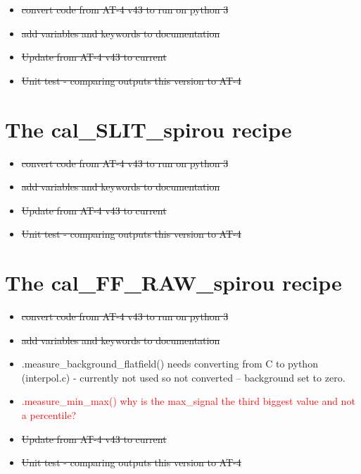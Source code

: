\begin{itemize}
	\item \sout{convert code from AT-4 v43 to run on python 3}
	\item \sout{add variables and keywords to documentation}
	\item \sout{Update from AT-4 v43 to current}
	\item \sout{Unit test - comparing outputs this version to AT-4}
\end{itemize}

\section{The cal\_SLIT\_spirou recipe}
\label{ch:todo:cal_SLIT_spirou}

\begin{itemize}
	\item \sout{convert code from AT-4 v43 to run on python 3}
	\item \sout{add variables and keywords to documentation}
	\item \sout{Update from AT-4 v43 to current}
	\item \sout{Unit test - comparing outputs this version to AT-4}
\end{itemize}

\section{The cal\_FF\_RAW\_spirou recipe}
\label{ch:todo:cal_FF_RAW_spirou}

\begin{itemize}
	\item \sout{convert code from AT-4 v43 to run on python 3}
	\item \sout{add variables and keywords to documentation}
	\item \spirouBACK.measure\_background\_flatfield() needs converting from C to python (interpol.c) - currently not used so not converted  -- background set to zero.
	\item \textcolor{red}{\spirouBACK.measure\_min\_max() why is the max\_signal the third biggest value and not a percentile?}
	\item \sout{Update from AT-4 v43 to current}
	\item \sout{Unit test - comparing outputs this version to AT-4}
\end{itemize}

